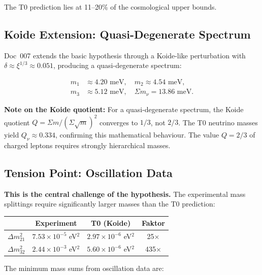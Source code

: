 	The T0 prediction lies at 11--20\% of the cosmological upper bounds.
	
	\subsection*{Koide Extension: Quasi-Degenerate Spectrum}
	
	Doc~007 extends the basic hypothesis through a Koide-like perturbation with \(\delta \approx \xi^{1/3} \approx 0.051\), producing a quasi-degenerate spectrum:
	
\begin{equation}
	\begin{aligned}
		m_1 &\approx 4.20\text{ meV},\quad 
		m_2 \approx 4.54\text{ meV}, \\
		m_3 &\approx 5.12\text{ meV},\quad 
		\Sigma m_\nu = 13.86\text{ meV.}
	\end{aligned}
\end{equation}
	
	\textbf{Note on the Koide quotient:} For a quasi-degenerate spectrum, the Koide quotient \(Q = \Sigma m / (\Sigma\sqrt{m})^2\) converges to \(1/3\), not \(2/3\). The T0 neutrino masses yield \(Q_\nu \approx 0.334\), confirming this mathematical behaviour. The value \(Q = 2/3\) of charged leptons requires strongly hierarchical masses.
	
	\subsection*{Tension Point: Oscillation Data}
	
	\textbf{This is the central challenge of the hypothesis.} The experimental mass splittings require significantly larger masses than the T0 prediction:
\begin{center}
	\small
	\begin{tabular}{lccc}
		& \textbf{Experiment} & \textbf{T0 (Koide)} & \textbf{Faktor} \\
		\hline
		\(\Delta m^2_{21}\) 
		& \(7.53 \times 10^{-5}\) eV\(^2\) 
		& \(2.97 \times 10^{-6}\) eV\(^2\) 
		& 25\(\times\) \\
		\(\Delta m^2_{32}\) 
		& \(2.44 \times 10^{-3}\) eV\(^2\) 
		& \(5.60 \times 10^{-6}\) eV\(^2\) 
		& 435\(\times\) \\
	\end{tabular}
\end{center}
	
	The minimum mass sums from oscillation data are:
	
